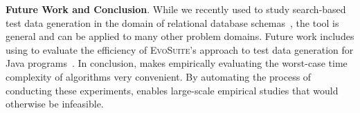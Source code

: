 
{\bf Future Work and Conclusion}.  While we recently used \toolname to
study search-based test data generation in the domain of relational
database schemas~\cite{kinneer2015}, the tool is general and can be
applied to many other problem domains. Future work includes using \toolname
to evaluate the efficiency of \textsc{EvoSuite}'s approach to test data
generation for Java programs~\cite{fraser2013}.  In conclusion,
\toolname makes empirically evaluating the worst-case time complexity of
algorithms very convenient.  By automating the process of
conducting these experiments, \toolname enables large-scale empirical
studies that would otherwise be infeasible.


